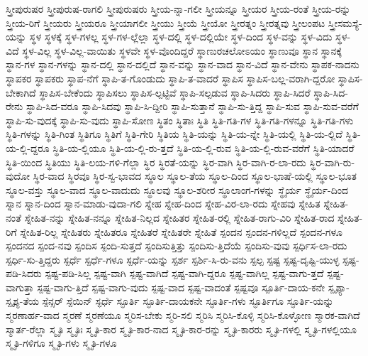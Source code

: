 {ಸ್ತ್ರೀಪುರುಷರ
ಸ್ತ್ರೀಪುರುಷ-ರಾಗಲಿ
ಸ್ತ್ರೀಪುರುಷರು
ಸ್ತ್ರೀಯ-ನ್ನಾ-ಗಲೀ
ಸ್ತ್ರೀಯನ್ನೂ
ಸ್ತ್ರೀಯರ
ಸ್ತ್ರೀಯ-ರಂತೆ
ಸ್ತ್ರೀಯ-ರನ್ನು
ಸ್ತ್ರೀಯ-ರಿಗೆ
ಸ್ತ್ರೀಯರು
ಸ್ತ್ರೀಯರೂ
ಸ್ತ್ರೀಯಾಗಲೀ
ಸ್ತ್ರೀಯು
ಸ್ತ್ರೀಯೆ
ಸ್ತ್ರೀಯೋ
ಸ್ತ್ರೀರತ್ನಂ
ಸ್ತ್ರೀರತ್ನವು
ಸ್ತ್ರೀಲಂಪಟ
ಸ್ತ್ರೀಸಮಸ್ಯೆ-ಯನ್ನು
ಸ್ಥಳ
ಸ್ಥಳಕ್ಕೆ
ಸ್ಥಳ-ಗಳಲ್ಲ
ಸ್ಥಳ-ಗಳ-ಲ್ಲೆಲ್ಲಾ
ಸ್ಥಳ-ದಲ್ಲಿ
ಸ್ಥಳ-ದಲ್ಲಿಯೇ
ಸ್ಥಳ-ದಿಂದ
ಸ್ಥಳ-ವನ್ನು
ಸ್ಥಳ-ವಿದು
ಸ್ಥಳ-ವಿದೆ
ಸ್ಥಳ-ವಿಲ್ಲ
ಸ್ಥಳ-ವಿಲ್ಲ-ವಾಯಿತು
ಸ್ಥಳವೇ
ಸ್ಥಳ-ವೊಂದಿದ್ದರೆ
ಸ್ಥಾಣುರಚಲೋಽಯಂ
ಸ್ಥಾಣುವೂ
ಸ್ಥಾನ
ಸ್ಥಾನಕ್ಕೆ
ಸ್ಥಾನ-ಗಳ
ಸ್ಥಾನ-ಗಳನ್ನು
ಸ್ಥಾನ-ದಲ್ಲಿ
ಸ್ಥಾನ-ದಲ್ಲಿದೆ
ಸ್ಥಾನ-ವನ್ನು
ಸ್ಥಾನ-ವಾದ
ಸ್ಥಾನ-ವಿದೆ
ಸ್ಥಾನ-ವೇನು
ಸ್ಥಾಪಕ-ನಾದನು
ಸ್ಥಾಪಕರ
ಸ್ಥಾಪಕರು
ಸ್ಥಾಪ-ನೆಗೆ
ಸ್ಥಾಪಿ-ತ-ಗೊಂಡುದು
ಸ್ಥಾಪಿ-ತ-ವಾದರೆ
ಸ್ಥಾಪಿಸ
ಸ್ಥಾಪಿಸ-ಬಲ್ಲ-ವರಾಗಿ-ದ್ದರೋ
ಸ್ಥಾಪಿಸ-ಬೇಕಾಗಿದೆ
ಸ್ಥಾಪಿಸ-ಬೇಕೆಂದು
ಸ್ಥಾಪಿಸಲು
ಸ್ಥಾಪಿಸ-ಲ್ಪಟ್ಟಿವೆ
ಸ್ಥಾಪಿ-ಸಲ್ಪಡುವ
ಸ್ಥಾಪಿ-ಸಿದರು
ಸ್ಥಾಪಿ-ಸಿದರೆ
ಸ್ಥಾಪಿ-ಸಿದ-ರೇನು
ಸ್ಥಾಪಿ-ಸಿದ-ವರೂ
ಸ್ಥಾಪಿ-ಸಿದವು
ಸ್ಥಾಪಿ-ಸಿ-ದ್ದೀರಿ
ಸ್ಥಾಪಿ-ಸುತ್ತಾನೆ
ಸ್ಥಾಪಿ-ಸು-ತ್ತಿದ್ದ
ಸ್ಥಾಪಿ-ಸುವ
ಸ್ಥಾಪಿ-ಸುವ-ವರೆಗೆ
ಸ್ಥಾಪಿ-ಸು-ವುದಕ್ಕೆ
ಸ್ಥಾಪಿ-ಸು-ವುದು
ಸ್ಥಾಪಿ-ಸೋಣ
ಸ್ಥಿತಂ
ಸ್ಥಿತಾಃ
ಸ್ಥಿತಿ
ಸ್ಥಿತಿ-ಗತಿ-ಗಳ
ಸ್ಥಿತಿ-ಗತಿ-ಗಳನ್ನೂ
ಸ್ಥಿತಿ-ಗತಿ-ಗಳು
ಸ್ಥಿತಿ-ಗಳನ್ನು
ಸ್ಥಿತಿ-ಗಿಂತ
ಸ್ಥಿತಿಗೂ
ಸ್ಥಿತಿಗೆ
ಸ್ಥಿತಿ-ಗೇರಿ
ಸ್ಥಿತಿಯ
ಸ್ಥಿತಿ-ಯನ್ನು
ಸ್ಥಿತಿ-ಯ-ನ್ನೇ
ಸ್ಥಿತಿ-ಯಲ್ಲಿ
ಸ್ಥಿತಿ-ಯ-ಲ್ಲಿದೆ
ಸ್ಥಿತಿ-ಯ-ಲ್ಲಿ-ದ್ದರೂ
ಸ್ಥಿತಿ-ಯ-ಲ್ಲಿಯೂ
ಸ್ಥಿತಿ-ಯ-ಲ್ಲಿ-ರು-ತ್ತದೆ
ಸ್ಥಿತಿ-ಯ-ಲ್ಲಿ-ರುವ
ಸ್ಥಿತಿ-ಯ-ಲ್ಲಿ-ರುವ-ವರೆಗೆ
ಸ್ಥಿತಿ-ಯಾದರೆ
ಸ್ಥಿತಿ-ಯಿಂದ
ಸ್ಥಿತಿಯು
ಸ್ಥಿತಿ-ಲಯ-ಗಳಿ-ಗೆಲ್ಲಾ
ಸ್ಥಿರ
ಸ್ಥಿರತೆ-ಯನ್ನು
ಸ್ಥಿರ-ವಾಗಿ
ಸ್ಥಿರ-ವಾಗಿ-ರ-ಲಾ-ರದು
ಸ್ಥಿರ-ವಾಗಿ-ರು-ವುದೋ
ಸ್ಥಿರ-ವಾದ
ಸ್ಥಿರವೂ
ಸ್ಥಿರ-ಸ್ವ-ಭಾವದ
ಸ್ಥೂಲ
ಸ್ಥೂಲ-ತೆಯ
ಸ್ಥೂಲ-ದಿಂದ
ಸ್ಥೂಲ-ಭಾಷೆ-ಯಲ್ಲಿ
ಸ್ಥೂಲ-ಭೂತ
ಸ್ಥೂಲ-ವಸ್ತು
ಸ್ಥೂಲ-ವಾದ
ಸ್ಥೂಲ-ವಾದುದು
ಸ್ಥೂಲವು
ಸ್ಥೂಲ-ಶರೀರ
ಸ್ಥೂಲಾಂಗ-ಗಳನ್ನು
ಸ್ಥೈರ್ಯ
ಸ್ಥೈರ್ಯ-ದಿಂದ
ಸ್ನಾನ
ಸ್ನಾನ-ದಿಂದ
ಸ್ನಾನ-ಮಾಡು-ವುದಾ-ಗಲಿ
ಸ್ನೇಹ
ಸ್ನೇಹ-ದಿಂದ
ಸ್ನೇಹ-ವಿರ-ಲಾ-ರದು
ಸ್ನೇಹವು
ಸ್ನೇಹಿತ
ಸ್ನೇಹಿತ-ನಂತೆ
ಸ್ನೇಹಿತ-ನನ್ನು
ಸ್ನೇಹಿತ-ನನ್ನೂ
ಸ್ನೇಹಿತ-ನಿಲ್ಲದ
ಸ್ನೇಹಿತರ
ಸ್ನೇಹಿತ-ರಲ್ಲಿ
ಸ್ನೇಹಿತ-ರಾಗು-ವಿರಿ
ಸ್ನೇಹಿತ-ರಾದ
ಸ್ನೇಹಿತ-ರಿಗೆ
ಸ್ನೇಹಿತ-ರಿಲ್ಲ
ಸ್ನೇಹಿತರು
ಸ್ನೇಹಿತರೂ
ಸ್ನೇಹಿತರೆ
ಸ್ನೇಹಿತರೇ
ಸ್ನೇಹಿತೆ
ಸ್ಪಂದನ
ಸ್ಪಂದನ-ಗಳಿಲ್ಲದೆ
ಸ್ಪಂದನ-ಗಳೂ
ಸ್ಪಂದನದ
ಸ್ಪಂದ-ನವು
ಸ್ಪಂದಿಸ
ಸ್ಪಂದಿ-ಸುತ್ತದೆ
ಸ್ಪಂದಿಸುತ್ತಿತ್ತು
ಸ್ಪಂದಿಸು-ತ್ತಿದೆಯೆ
ಸ್ಪಂದಿಸು-ವುವು
ಸ್ಪರ್ಧಿಸ-ಲಾ-ರದು
ಸ್ಪರ್ಧಿ-ಸು-ತ್ತಿದ್ದರು
ಸ್ಪರ್ಧೆ
ಸ್ಪರ್ಧೆ-ಗಳೂ
ಸ್ಪರ್ಧೆ-ಯನ್ನು
ಸ್ಪರ್ಶ
ಸ್ಪರ್ಶಿ-ಸಿ-ರು-ವನು
ಸ್ಪಲ್ಪ
ಸ್ಪಷ್ಟ
ಸ್ಪಷ್ಟ-ದೃಷ್ಟಿ-ಯುಳ್ಳ
ಸ್ಪಷ್ಟ-ಪಡಿ-ಸಿದರು
ಸ್ಪಷ್ಟ-ಪಡಿ-ಸಿಲ್ಲ
ಸ್ಪಷ್ಟ-ವಾಗಿ
ಸ್ಪಷ್ಟ-ವಾಗಿದೆ
ಸ್ಪಷ್ಟ-ವಾಗಿ-ದ್ದರೂ
ಸ್ಪಷ್ಟ-ವಾಗಿಲ್ಲ
ಸ್ಪಷ್ಟ-ವಾಗು-ತ್ತದೆ
ಸ್ಪಷ್ಟ-ವಾಗುತ್ತಾ
ಸ್ಪಷ್ಟ-ವಾಗು-ತ್ತಿದೆ
ಸ್ಪಷ್ಟ-ವಾಗು-ವುದು
ಸ್ಪಷ್ಟ-ವಾದ
ಸ್ಪಷ್ಟ-ವಾದಂತೆ
ಸ್ಪಷ್ಟವೂ
ಸ್ಪೂರ್ತಿ-ದಾಯ-ಕನೇ
ಸ್ಪೃಶ್ಯಾ-ಸ್ಪೃಶ್ಯ-ತೆಯ
ಸ್ಪೆನ್ಸರ್
ಸ್ಪೆಯಿನ್
ಸ್ಫರ್ಧೆ
ಸ್ಫೂರ್ತಿ
ಸ್ಫೂರ್ತಿ-ದಾಯಕನೇ
ಸ್ಫೂರ್ತಿ-ಗಳು
ಸ್ಫೂರ್ತಿಗೂ
ಸ್ಫೂರ್ತಿ-ಯನ್ನು
ಸ್ಮರಣಾರ್ಹ-ವಾದ
ಸ್ಮರಣೆ
ಸ್ಮರಣೆಯೂ
ಸ್ಮರಿಸ-ಬೇಕು
ಸ್ಮರಿ-ಸಲಿ
ಸ್ಮರಿಸಿ
ಸ್ಮರಿಸಿ-ಕೊಳ್ಳಿ
ಸ್ಮರಿಸಿ-ಕೊಳ್ಳೋಣ
ಸ್ಮಾರಕ-ವಾಗಿದೆ
ಸ್ಮಾರ್ತ-ರೆಲ್ಲಾ
ಸ್ಮೃತಿ
ಸ್ಮೃತಿಃ
ಸ್ಮೃತಿ-ಕಾರ
ಸ್ಮೃತಿ-ಕಾರ-ನಾದ
ಸ್ಮೃತಿ-ಕಾರ-ರನ್ನು
ಸ್ಮೃತಿ-ಕಾರರು
ಸ್ಮೃತಿ-ಗಳಲ್ಲಿ
ಸ್ಮೃತಿ-ಗಳಲ್ಲಿಯೂ
ಸ್ಮೃತಿ-ಗಳಿಗೂ
ಸ್ಮೃತಿ-ಗಳು
ಸ್ಮೃತಿ-ಗಳೂ
}
